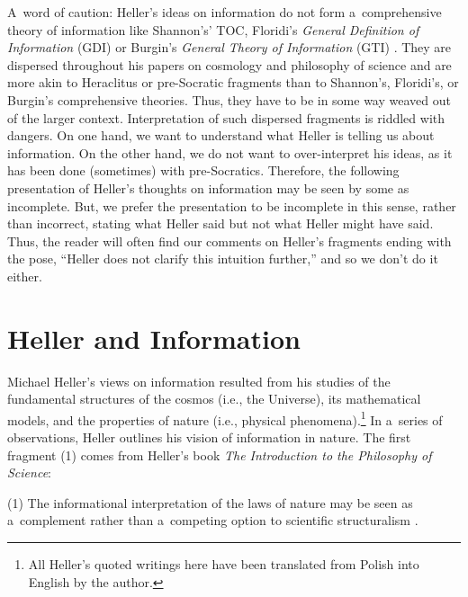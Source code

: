 A~word of caution: Heller's ideas on information do not form a~comprehensive theory of information like Shannon's' TOC, Floridi's \textit{General Definition of Information} (GDI) 
\parencite[see e.g][]{floridi_philosophy_2011} %
 or Burgin's \textit{General Theory of Information} (GTI) 
\parencite[][]{burgin_information_2003}. %
 They are dispersed throughout his papers on cosmology and philosophy of science and are more akin to Heraclitus or pre-Socratic fragments than to Shannon's, Floridi's, or Burgin's comprehensive theories. Thus, they have to be in some way weaved out of the larger context. Interpretation of such dispersed fragments is riddled with dangers. On one hand, we want to understand what Heller is telling us about information. On the other hand, we do not want to over-interpret his ideas, as it has been done (sometimes) with pre-Socratics. Therefore, the following presentation of Heller's thoughts on information may be seen by some as incomplete. But, we prefer the presentation to be incomplete in this sense, rather than incorrect, stating what Heller said but not what Heller might have said. Thus, the reader will often find our comments on Heller's fragments ending with the pose, ``Heller does not clarify this intuition further,'' and so we don't do it either.



\section{Heller and Information}

Michael Heller's views on information resulted from his studies of the fundamental structures of the cosmos (i.e., the Universe), its mathematical models, and the properties of nature (i.e., physical phenomena).\footnote{All Heller's quoted writings here have been translated from Polish into English by the author.} In a~series of observations, Heller outlines his vision of information in nature. The first fragment (1) comes from Heller's book \textit{The Introduction to the Philosophy of Science}:



(1) The informational interpretation of the laws of nature may be seen as a~complement rather than a~competing option to scientific structuralism 
\parencite[][pp.62–63]{heller_filozofia_2009}.%




